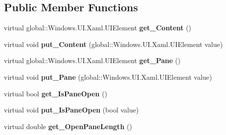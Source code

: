 \subsection*{Public Member Functions}
\begin{DoxyCompactItemize}
\item 
\mbox{\label{class_windows_1_1_u_i_1_1_xaml_1_1_controls_1_1_split_view_a8e8c81d98be4733b9d0e0c12f077d2ab}} 
virtual global\+::\+Windows.\+U\+I.\+Xaml.\+U\+I\+Element {\bfseries get\+\_\+\+Content} ()
\item 
\mbox{\label{class_windows_1_1_u_i_1_1_xaml_1_1_controls_1_1_split_view_a858c49c1b29c83b8d2256306a2311f25}} 
virtual void {\bfseries put\+\_\+\+Content} (global\+::\+Windows.\+U\+I.\+Xaml.\+U\+I\+Element value)
\item 
\mbox{\label{class_windows_1_1_u_i_1_1_xaml_1_1_controls_1_1_split_view_a6c58d7776daf88d1bd3c41ac7d058eaa}} 
virtual global\+::\+Windows.\+U\+I.\+Xaml.\+U\+I\+Element {\bfseries get\+\_\+\+Pane} ()
\item 
\mbox{\label{class_windows_1_1_u_i_1_1_xaml_1_1_controls_1_1_split_view_a8c4b09d201319f93f6bc55c355264db6}} 
virtual void {\bfseries put\+\_\+\+Pane} (global\+::\+Windows.\+U\+I.\+Xaml.\+U\+I\+Element value)
\item 
\mbox{\label{class_windows_1_1_u_i_1_1_xaml_1_1_controls_1_1_split_view_a0f921a26afd4e2d74579c00a1ab97dee}} 
virtual bool {\bfseries get\+\_\+\+Is\+Pane\+Open} ()
\item 
\mbox{\label{class_windows_1_1_u_i_1_1_xaml_1_1_controls_1_1_split_view_ab5edefa99b08ffbc412d0e00aa5b531c}} 
virtual void {\bfseries put\+\_\+\+Is\+Pane\+Open} (bool value)
\item 
\mbox{\label{class_windows_1_1_u_i_1_1_xaml_1_1_controls_1_1_split_view_a854842b7daf878725df6c255d01fc31e}} 
virtual double {\bfseries get\+\_\+\+Open\+Pane\+Length} ()

\end{DoxyCompactItemize}
